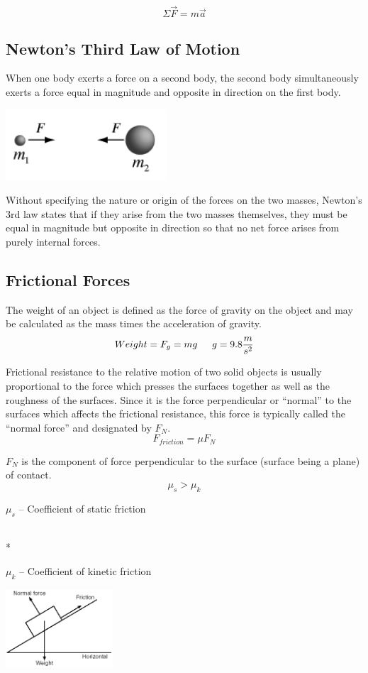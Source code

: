 \documentclass{article}
\begin{document}
\[
\Sigma\vec{F}=m\vec{a}
\]

\subsection{Newton's Third Law of Motion}

When one body exerts a force on a second body, the second body simultaneously exerts a force equal in magnitude and opposite in direction on the first body.
\begin{multicols}{2}
  \centerline{\includegraphics[width=6cm]{thirdLaw.png}}
  \columnbreak
  Without specifying the nature or origin of the forces on the two masses, Newton's 3rd law states that if they arise from the two masses themselves, they must be equal in magnitude but opposite in direction so that no net force arises from purely internal forces.
\end{multicols}

\subsection{Frictional Forces}

The weight of an object is defined as the force of gravity on the object and may be calculated as the mass times the acceleration of gravity.
\[
Weight=F_g=mg \indent g=9.8\frac{m}{s^2}
\]

Frictional resistance to the relative motion of two solid objects is usually proportional to the force which presses the surfaces together as well as the roughness of the surfaces. Since it is the force perpendicular or ``normal'' to the surfaces which affects the frictional resistance, this force is typically called the ``normal force'' and designated by $F_N$.
\[
F_{friction}=\mu F_N
\]
\begin{multicols}{2}
  \noindent$F_N$ is the component of force perpendicular to the surface (surface being a plane) of contact.
  \[
  \mu_s>\mu_k
  \]
  \centerline{$\mu_s$ -- Coefficient of static friction}\\*
  \centerline{$\mu_k$ -- Coefficient of kinetic friction}
  \columnbreak
  \centerline{\includegraphics[width=4cm]{normalForce.png}}
\end{multicols}
\end{document}
